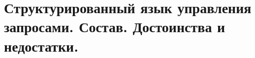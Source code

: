 {
	\section{Структурированный язык управления запросами. Состав. Достоинства и недостатки.}
	\newpage
}
